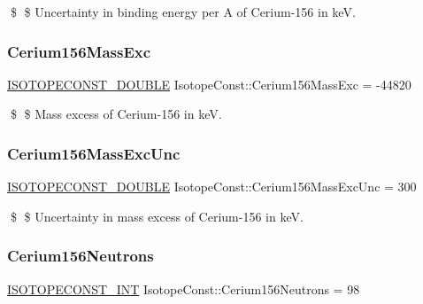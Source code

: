 \$ \$ Uncertainty in binding energy per A of Cerium-\/156 in keV. \mbox{\label{group___isotope_const-_cerium-_ce156_ga299e9698c2283b8d8930a28ef072231a}} 
\subsubsection{\texorpdfstring{Cerium156\+Mass\+Exc}{Cerium156MassExc}}
{\footnotesize\ttfamily \mbox{\hyperlink{group___isotope_const-_macros_ga8f45a7272ce02c0b4c65c44636ed719a}{I\+S\+O\+T\+O\+P\+E\+C\+O\+N\+S\+T\+\_\+\+D\+O\+U\+B\+LE}} Isotope\+Const\+::\+Cerium156\+Mass\+Exc = -\/44820}

\$ \$ Mass excess of Cerium-\/156 in keV. \mbox{\label{group___isotope_const-_cerium-_ce156_ga8e4aefbdc25767b1856de53f5032300e}} 
\subsubsection{\texorpdfstring{Cerium156\+Mass\+Exc\+Unc}{Cerium156MassExcUnc}}
{\footnotesize\ttfamily \mbox{\hyperlink{group___isotope_const-_macros_ga8f45a7272ce02c0b4c65c44636ed719a}{I\+S\+O\+T\+O\+P\+E\+C\+O\+N\+S\+T\+\_\+\+D\+O\+U\+B\+LE}} Isotope\+Const\+::\+Cerium156\+Mass\+Exc\+Unc = 300}

\$ \$ Uncertainty in mass excess of Cerium-\/156 in keV. \mbox{\label{group___isotope_const-_cerium-_ce156_ga172054ed135da5260ff220dc95a94ee4}} 
\subsubsection{\texorpdfstring{Cerium156\+Neutrons}{Cerium156Neutrons}}
{\footnotesize\ttfamily \mbox{\hyperlink{group___isotope_const-_macros_ga5f18360b3e99483a35c32d789e62621c}{I\+S\+O\+T\+O\+P\+E\+C\+O\+N\+S\+T\+\_\+\+I\+NT}} Isotope\+Const\+::\+Cerium156\+Neutrons = 98}

